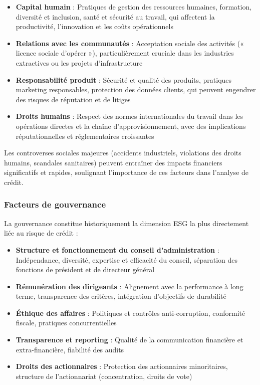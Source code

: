 \begin{itemize}
    \item \textbf{Capital humain} : Pratiques de gestion des ressources humaines, formation, diversité et inclusion, santé et sécurité au travail, qui affectent la productivité, l'innovation et les coûts opérationnels
    
    \item \textbf{Relations avec les communautés} : Acceptation sociale des activités (« licence sociale d'opérer »), particulièrement cruciale dans les industries extractives ou les projets d'infrastructure
    
    \item \textbf{Responsabilité produit} : Sécurité et qualité des produits, pratiques marketing responsables, protection des données clients, qui peuvent engendrer des risques de réputation et de litiges
    
    \item \textbf{Droits humains} : Respect des normes internationales du travail dans les opérations directes et la chaîne d'approvisionnement, avec des implications réputationnelles et réglementaires croissantes
\end{itemize}

Les controverses sociales majeures (accidents industriels, violations des droits humains, scandales sanitaires) peuvent entraîner des impacts financiers significatifs et rapides, soulignant l'importance de ces facteurs dans l'analyse de crédit.

\subsubsection{Facteurs de gouvernance}

La gouvernance constitue historiquement la dimension ESG la plus directement liée au risque de crédit :

\begin{itemize}
    \item \textbf{Structure et fonctionnement du conseil d'administration} : Indépendance, diversité, expertise et efficacité du conseil, séparation des fonctions de président et de directeur général
    
    \item \textbf{Rémunération des dirigeants} : Alignement avec la performance à long terme, transparence des critères, intégration d'objectifs de durabilité
    
    \item \textbf{Éthique des affaires} : Politiques et contrôles anti-corruption, conformité fiscale, pratiques concurrentielles
    
    \item \textbf{Transparence et reporting} : Qualité de la communication financière et extra-financière, fiabilité des audits
    
    \item \textbf{Droits des actionnaires} : Protection des actionnaires minoritaires, structure de l'actionnariat (concentration, droits de vote)
\end{itemize}

